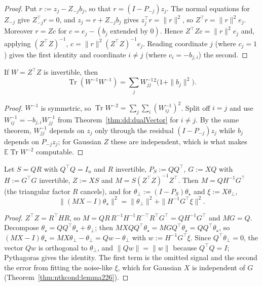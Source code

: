 \begin{proof}
  \leanok
Put $r:=z_j-Z_{-j}b_j$, so that $r=(I-P_{-j})z_j$. The normal equations for $Z_{-j}$ give $Z_{-j}^\top r=0$, and $z_j=r+Z_{-j}b_j$ gives $z_j^\top r=\|r\|^2$, so
$Z^\top r=\|r\|^2e_j$. Moreover $r=Zc$ for $c=e_j-(b_j\text{ extended by }0)$. Hence
$Z^\top Zc=\|r\|^2e_j$ and, applying $(Z^\top Z)^{-1}$, $c=\|r\|^2(Z^\top Z)^{-1}e_j$. Reading coordinate $j$ (where $c_j=1$) gives the first identity and
coordinate $i\neq j$ (where $c_i=-b_{j,i}$) the second.
\end{proof}

\begin{theorem}\label{thm:dd:traceSecond}
  \leanok
If $W=Z^\top Z$ is invertible, then
\[
  \operatorname{Tr}(W^{-1}W^{-1})=\sum_jW^{-1}_{jj}{}^2\bigl(1+\|b_j\|^2\bigr).
\]
\end{theorem}

\begin{proof}
  \leanok
$W^{-1}$ is symmetric, so $\operatorname{Tr}W^{-2}=\sum_j\sum_i(W^{-1}_{ij})^2$. Split off $i=j$ and use $W^{-1}_{ij}=-b_{j,i}W^{-1}_{jj}$
from Theorem~\ref{thm:dd:dualVector} for $i\neq j$. By the same theorem, $W^{-1}_{jj}$ depends on $z_j$ only through the residual
$(I-P_{-j})z_j$ while $b_j$ depends on $P_{-j}z_j$; for Gaussian $Z$ these are independent, which is what makes $\mathbb E\operatorname{Tr}W^{-2}$ computable.
\end{proof}

\begin{theorem}\label{thm:dd:biasReduction}
  \leanok
Let $S=QR$ with $Q^\top Q=I_n$ and $R$ invertible, $P_S:=QQ^\top$, $G:=XQ$ with $H:=G^\top G$ invertible, $Z:=XS$ and $M=S(Z^\top Z)^{-1}Z^\top$.
Then $M=QH^{-1}G^\top$ (the triangular factor $R$ cancels), and for $\theta_\perp:=(I-P_S)\theta_\star$ and $\xi:=X\theta_\perp$,
\[
  \|(MX-I)\theta_\star\|^2=\|\theta_\perp\|^2+\|H^{-1}G^\top\xi\|^2 .
\]
\end{theorem}

\begin{proof}
  \leanok
$Z^\top Z=R^\top HR$, so $M=QR\,R^{-1}H^{-1}R^{-\top}R^\top G^\top=QH^{-1}G^\top$ and $MG=Q$. Decompose $\theta_\star=QQ^\top\theta_\star+\theta_\perp$; then
$MXQQ^\top\theta_\star=MGQ^\top\theta_\star=QQ^\top\theta_\star$, so $(MX-I)\theta_\star=MX\theta_\perp-\theta_\perp=Qw-\theta_\perp$ with $w:=H^{-1}G^\top\xi$.
Since $Q^\top\theta_\perp=0$, the vector $Qw$ is orthogonal to $\theta_\perp$, and $\|Qw\|=\|w\|$ because $Q^\top Q=I$; Pythagoras gives the identity.
The first term is the omitted signal and the second the error from fitting the noise-like $\xi$, which for Gaussian $X$ is independent of $G$
(Theorem~\ref{thm:ntkcond:lemma226}).
\end{proof}


